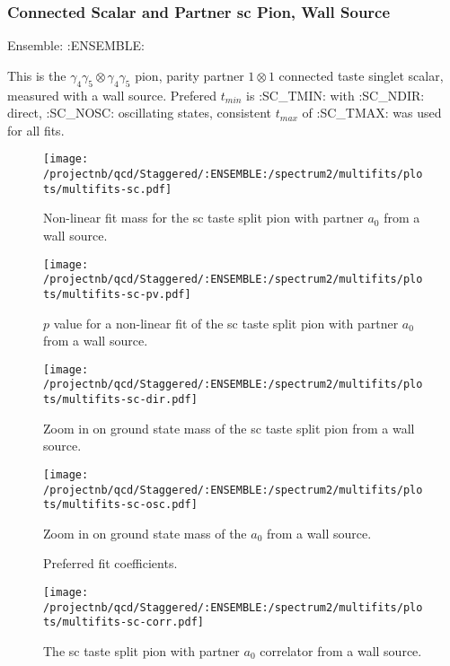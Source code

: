 \subsubsection{Connected Scalar and Partner sc Pion, Wall Source}

Ensemble: :ENSEMBLE:

This is the $\gamma_4 \gamma_5 \otimes \gamma_4 \gamma_5$ pion, parity partner $1 \otimes 1$ connected taste singlet scalar, measured with a wall source. Prefered $t_{min}$ is :SC_TMIN: with :SC_NDIR: direct, :SC_NOSC: oscillating states, consistent $t_{max}$ of :SC_TMAX: was used for all fits.

\begin{multicols}{2}
\begin{figure}[H]
\centering
\texttt{[image: /projectnb/qcd/Staggered/:ENSEMBLE:/spectrum2/multifits/plots/multifits-sc.pdf]}
\caption{Non-linear fit mass for the sc taste split pion with partner $a_0$ from a wall source.}
\end{figure}
\columnbreak
\begin{figure}[H]
\centering
\texttt{[image: /projectnb/qcd/Staggered/:ENSEMBLE:/spectrum2/multifits/plots/multifits-sc-pv.pdf]}
\caption{$p$ value for a non-linear fit of the sc taste split pion with partner $a_0$ from a wall source.}
\end{figure}
\end{multicols}

\begin{multicols}{2}
\begin{figure}[H]
\centering
\texttt{[image: /projectnb/qcd/Staggered/:ENSEMBLE:/spectrum2/multifits/plots/multifits-sc-dir.pdf]}
\caption{Zoom in on ground state mass of the sc taste split pion from a wall source.}
\end{figure}
\columnbreak
\begin{figure}[H]
\centering
\texttt{[image: /projectnb/qcd/Staggered/:ENSEMBLE:/spectrum2/multifits/plots/multifits-sc-osc.pdf]}
\caption{Zoom in on ground state mass of the $a_0$ from a wall source.}
\end{figure}
\end{multicols}

\begin{multicols}{2}
\begin{figure}[H]
\centering
\scriptsize

\caption{Preferred fit coefficients.}
\end{figure}
\columnbreak
\begin{figure}[H]
\centering
\texttt{[image: /projectnb/qcd/Staggered/:ENSEMBLE:/spectrum2/multifits/plots/multifits-sc-corr.pdf]}
\caption{The sc taste split pion with partner $a_0$ correlator from a wall source.}
\end{figure}
\end{multicols}

